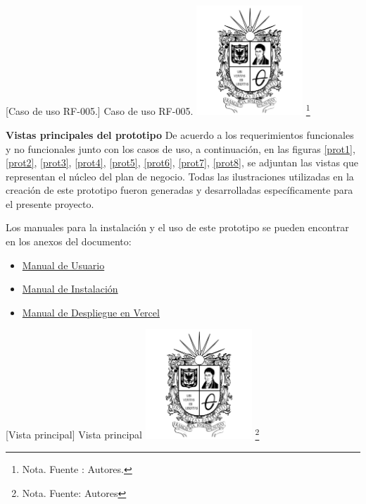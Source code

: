 {    \vspace{2mm}
    \begin{minipage}{0.9\textwidth}
    \centering
    [{Caso de uso RF-005.}]{ Caso de uso RF-005. }
    \label{caso1}
    \includegraphics[width=0.3\textwidth]{Content/Images/Escudo_UD.png}
    \footnote{Nota. \textup{Fuente : Autores.}}
    \end{minipage}
    


\textbf{Vistas principales del prototipo}
De acuerdo a los requerimientos funcionales y no funcionales junto con los casos de uso, a continuación, en las figuras \ref{prot1}, \ref{prot2}, \ref{prot3}, \ref{prot4}, \ref{prot5}, \ref{prot6}, \ref{prot7}, \ref{prot8}, se adjuntan las vistas que representan el núcleo del plan de negocio. Todas las ilustraciones utilizadas en la creación de este prototipo fueron generadas y desarrolladas específicamente para el presente proyecto.

Los manuales para la instalación y el uso de este prototipo se pueden encontrar en los anexos del documento:
\begin{itemize}
    \item \hyperref[manual-usuario]{Manual de Usuario}
    \item \hyperref[manual-instalacion]{Manual de Instalación}
    \item \hyperref[manual-despliegue]{Manual de Despliegue en Vercel}
\end{itemize}


    \vspace{2mm}
    \begin{minipage}{0.9\textwidth}
    \centering
    [{Vista principal}]{ Vista principal }
    \label{prot1}
    \includegraphics[width=0.3\textwidth]{Content/Images/Escudo_UD.png}
    \footnote{Nota. \textup{Fuente: Autores}}
    \end{minipage}
    
}
